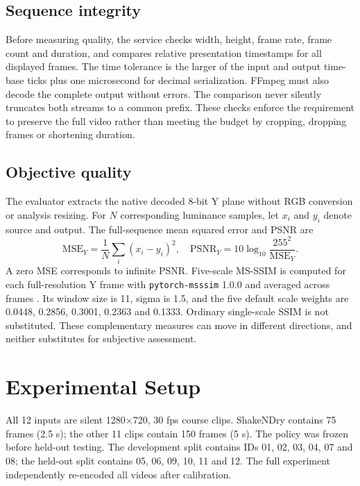 \documentclass[conference]{IEEEtran}
\begin{document}
\subsection{Sequence integrity}
Before measuring quality, the service checks width, height, frame rate, frame count and duration, and compares relative presentation timestamps for all displayed frames. The time tolerance is the larger of the input and output time-base ticks plus one microsecond for decimal serialization. FFmpeg must also decode the complete output without errors. The comparison never silently truncates both streams to a common prefix. These checks enforce the requirement to preserve the full video rather than meeting the budget by cropping, dropping frames or shortening duration.

\subsection{Objective quality}
The evaluator extracts the native decoded 8-bit Y plane without RGB conversion or analysis resizing. For $N$ corresponding luminance samples, let $x_i$ and $y_i$ denote source and output. The full-sequence mean squared error and PSNR are
\begin{equation}
\mathrm{MSE}_Y=\frac{1}{N}\sum_i(x_i-y_i)^2,\quad
\mathrm{PSNR}_Y=10\log_{10}\frac{255^2}{\mathrm{MSE}_Y}.
\end{equation}
A zero MSE corresponds to infinite PSNR. Five-scale MS-SSIM is computed for each full-resolution Y frame with \texttt{pytorch-msssim} 1.0.0 and averaged across frames \cite{msssim}. Its window size is 11, sigma is 1.5, and the five default scale weights are 0.0448, 0.2856, 0.3001, 0.2363 and 0.1333. Ordinary single-scale SSIM is not substituted. These complementary measures can move in different directions, and neither substitutes for subjective assessment.

\section{Experimental Setup}
All 12 inputs are silent 1280$\times$720, 30 fps course clips. ShakeNDry contains 75 frames (2.5 s); the other 11 clips contain 150 frames (5 s). The policy was frozen before held-out testing. The development split contains IDs 01, 02, 03, 04, 07 and 08; the held-out split contains 05, 06, 09, 10, 11 and 12. The full experiment independently re-encoded all videos after calibration.
\end{document}
